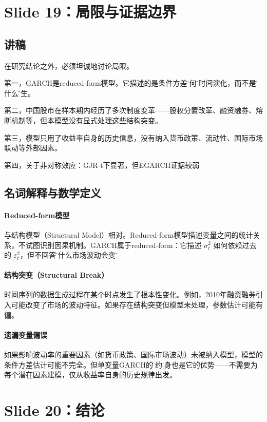 \documentclass[11pt,a4paper]{article}
\begin{document}
\newpage
\section*{Slide 19：局限与证据边界}

\subsection*{讲稿}
在研究结论之外，必须坦诚地讨论局限。

第一，GARCH是reduced-form模型。它描述的是条件方差\"如何\"随时间演化，而不是\"为什么\"产生。

第二，中国股市在样本期内经历了多次制度变革——股权分置改革、融资融券、熔断机制等，但本模型没有显式处理这些结构突变。

第三，模型只用了收益率自身的历史信息，没有纳入货币政策、流动性、国际市场联动等外部因素。

第四，关于非对称效应：GJR-t下显著，但EGARCH证据较弱

\subsection*{名词解释与数学定义}

\paragraph{Reduced-form模型} 与结构模型（Structural Model）相对。Reduced-form模型描述变量之间的统计关系，不试图识别因果机制。GARCH属于reduced-form：它描述 \(\sigma_t^2\) 如何依赖过去的 \(\varepsilon_t^2\)，但不回答\"为什么市场波动会变\"。

\paragraph{结构突变（Structural Break）} 时间序列的数据生成过程在某个时点发生了根本性变化。例如，2010年融资融券引入可能改变了市场的波动特征。如果存在结构突变但模型未处理，参数估计可能有偏。

\paragraph{遗漏变量偏误} 如果影响波动率的重要因素（如货币政策、国际市场波动）未被纳入模型，模型的条件方差估计可能不完全。但单变量GARCH的\"简约\"本身也是它的优势——不需要为每个潜在因素建模，仅从收益率自身的历史规律出发。

\newpage
\section*{Slide 20：结论}
\end{document}
